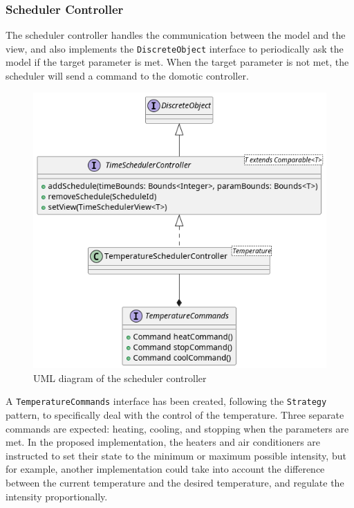 \subsubsection{Scheduler Controller}

The scheduler controller handles the communication between the model and the view, and also implements the \texttt{DiscreteObject} interface
to periodically ask the model if the target parameter is met.
When the target parameter is not met, the scheduler will send a command to the domotic controller.

\begin{figure}[H]
\centering{}
\includegraphics[width=\textwidth,height=\textheight,keepaspectratio]{magnani/uml/scheduler-controller.png}
\caption{UML diagram of the scheduler controller}
\label{magnani:uml:scheduler-controller}
\end{figure}

A \texttt{TemperatureCommands} interface has been created, following the \texttt{Strategy} pattern, to
specifically deal with the control of the temperature. \newline
Three separate commands are expected: heating, cooling, and stopping when the parameters are met.
In the proposed implementation, the heaters and air conditioners are instructed to set their state
to the minimum or maximum possible intensity, but for example, another implementation could
take into account the difference between the current temperature and the desired temperature,
and regulate the intensity proportionally.

